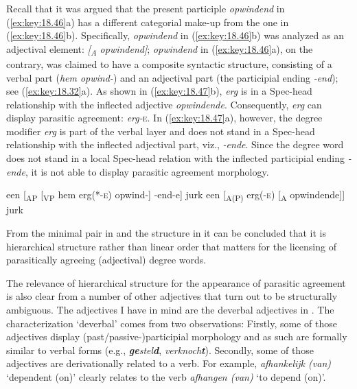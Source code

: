 \documentclass[output=paper]{langsci/langscibook}
\begin{document}
Recall that it was argued that the present participle \emph{opwindend} in
(\ref{ex:key:18.46}a) has a different categorial make-up from the one in
(\ref{ex:key:18.46}b). Specifically, \emph{opwindend} in (\ref{ex:key:18.46}b) was
analyzed as an adjectival element: \emph{[\textsubscript{A} opwindend]};
\emph{opwindend} in (\ref{ex:key:18.46}a), on the contrary, was claimed to have a
composite syntactic structure, consisting of a verbal part (\emph{hem opwind-})
and an adjectival part (the participial ending \emph{-end}); see
(\ref{ex:key:18.32}a). As shown in (\ref{ex:key:18.47}b), \emph{erg} is in a Spec-head
relationship with the inflected adjective \emph{opwindende}. Consequently,
\emph{erg} can display parasitic agreement: \emph{erg-}\textsc{e}. In
(\ref{ex:key:18.47}a), however, the degree modifier \emph{erg} is part of the verbal
layer and does not stand in a Spec-head relationship with the inflected
adjectival part, viz., \emph{-ende}. Since the degree word does not stand in a
local Spec-head relation with the inflected participial ending \emph{-ende}, it
is not able to display parasitic agreement morphology.

\ea%
    \label{ex:key:18.47}
	\ea een [\textsubscript{AP} [\textsubscript{VP} hem erg(*-\textsc{e}) opwind-] -end-e] jurk
	\ex een [\textsubscript{A(P)} erg(\textsc{-e}) [\textsubscript{A} opwindende]] jurk
	\z
\z

From the minimal pair in  and the structure in 
it can be concluded that it is hierarchical structure rather than linear order
that matters for the licensing of parasitically agreeing (adjectival) degree
words.

The relevance of hierarchical structure for the appearance of parasitic
agreement is also clear from a number of other adjectives that turn out to be
structurally ambiguous. The adjectives I have in mind are the deverbal
adjectives in . The characterization \enquote*{deverbal} comes
from two observations: Firstly, some of those adjectives display
(past/passive-)participial morphology and as such are formally similar to
verbal forms (e.g., \emph{\textbf{ge}stel\textbf{d}},
\emph{verknoch\textbf{t}}). Secondly, some of those adjectives are
derivationally related to a verb. For example, \emph{afhankelijk (van)}
\enquote*{dependent (on)} clearly relates to the verb \emph{afhangen (van)}
\enquote*{to depend (on)}.\newpage
\end{document}
